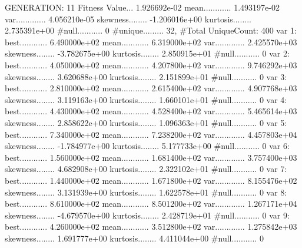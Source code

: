 \documentclass[oneside,letterpaper,titlepage]{article}
\begin{document}
\begin{Schunk}
\begin{Soutput}
GENERATION: 11
Fitness Value... 1.926692e-02
mean............ 1.493197e-02
var............. 4.056210e-05
skewness........ -1.206016e+00
kurtosis........ 2.735391e+00
#null........... 0
#unique......... 32, #Total UniqueCount: 400
var 1:
best............ 6.490000e+02
mean............ 6.319000e+02
var............. 2.425570e+03
skewness........ -3.782675e+00
kurtosis........ 2.850915e+01
#null........... 0
var 2:
best............ 4.050000e+02
mean............ 4.207800e+02
var............. 9.746292e+03
skewness........ 3.620688e+00
kurtosis........ 2.151899e+01
#null........... 0
var 3:
best............ 2.810000e+02
mean............ 2.615400e+02
var............. 4.907768e+03
skewness........ 3.119163e+00
kurtosis........ 1.660101e+01
#null........... 0
var 4:
best............ 4.430000e+02
mean............ 4.528400e+02
var............. 5.465614e+03
skewness........ 2.858622e+00
kurtosis........ 1.096363e+01
#null........... 0
var 5:
best............ 7.340000e+02
mean............ 7.238200e+02
var............. 4.457803e+04
skewness........ -1.784977e+00
kurtosis........ 5.177733e+00
#null........... 0
var 6:
best............ 1.560000e+02
mean............ 1.681400e+02
var............. 3.757400e+03
skewness........ 4.682908e+00
kurtosis........ 2.322102e+01
#null........... 0
var 7:
best............ 1.440000e+02
mean............ 1.671800e+02
var............. 8.155476e+02
skewness........ 3.131939e+00
kurtosis........ 1.622578e+01
#null........... 0
var 8:
best............ 8.610000e+02
mean............ 8.501200e+02
var............. 1.267171e+04
skewness........ -4.679570e+00
kurtosis........ 2.428719e+01
#null........... 0
var 9:
best............ 4.260000e+02
mean............ 3.512800e+02
var............. 1.275842e+03
skewness........ 1.691777e+00
kurtosis........ 4.411044e+00
#null........... 0


\end{Soutput}
\end{Schunk}
\end{document}
